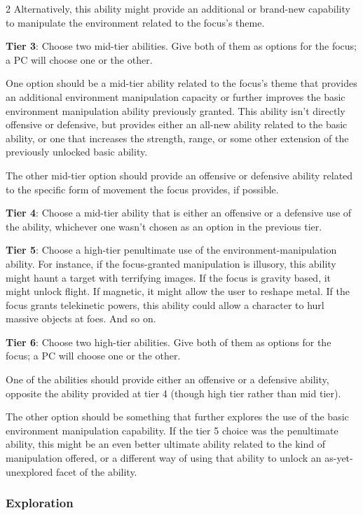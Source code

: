 \begin{multicols}{2}
Alternatively, this ability might provide an additional or brand-new capability to manipulate the environment related to the focus’s theme.

\textbf{Tier 3}: Choose two mid-tier abilities. Give both of them as options for the focus; a PC will choose one or the other.

One option should be a mid-tier ability related to the focus’s theme that provides an additional environment manipulation capacity or further improves the basic environment manipulation ability previously granted. This ability isn’t directly offensive or defensive, but provides either an all-new ability related to the basic ability, or one that increases the strength, range, or some other extension of the previously unlocked basic ability.

The other mid-tier option should provide an offensive or defensive ability related to the specific form of movement the focus provides, if possible.

\textbf{Tier 4}: Choose a mid-tier ability that is either an offensive or a defensive use of the ability, whichever one wasn’t chosen as an option in the previous tier.

\textbf{Tier 5}: Choose a high-tier penultimate use of the environment-manipulation ability. For instance, if the focus-granted manipulation is illusory, this ability might haunt a target with terrifying images. If the focus is gravity based, it might unlock flight. If magnetic, it might allow the user to reshape metal. If the focus grants telekinetic powers, this ability could allow a character to hurl massive objects at foes. And so on.

\textbf{Tier 6}: Choose two high-tier abilities. Give both of them as options for the focus; a PC will choose one or the other.

One of the abilities should provide either an offensive or a defensive ability, opposite the ability provided at tier 4 (though high tier rather than mid tier).

The other option should be something that further explores the use of the basic environment manipulation capability. If the tier 5 choice was the penultimate ability, this might be an even better ultimate ability related to the kind of manipulation offered, or a different way of using that ability to unlock an as-yet-unexplored facet of the ability.

\subsubsection{Exploration}


\end{multicols}
